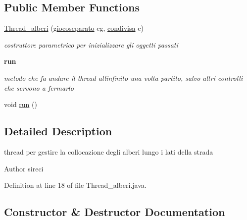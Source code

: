 \subsection*{Public Member Functions}
\begin{DoxyCompactItemize}
\item 
\hyperlink{classcargame_1_1_thread__alberi_ae91e3c161fc62007f354a164e2e090b2}{Thread\+\_\+alberi} (\hyperlink{classcargame_1_1giocoseparato}{giocoseparato} cg, \hyperlink{classcargame_1_1condivisa}{condivisa} c)
\begin{DoxyCompactList}\small\item\em costruttore parametrico per inizializzare gli oggetti passati \end{DoxyCompactList}\end{DoxyCompactItemize}
\begin{Indent}\textbf{ run}\par
{\em metodo che fa andare il thread all\textquotesingle{}infinito una volta partito, salvo altri controlli che servono a fermarlo }\begin{DoxyCompactItemize}
\item 
void \hyperlink{classcargame_1_1_thread__alberi_a13a43e6d814de94978c515cb084873b1}{run} ()
\end{DoxyCompactItemize}
\end{Indent}


\subsection{Detailed Description}
thread per gestire la collocazione degli alberi lungo i lati della strada 

\begin{DoxyAuthor}{Author}
sireci 
\end{DoxyAuthor}


Definition at line 18 of file Thread\+\_\+alberi.\+java.



\subsection{Constructor \& Destructor Documentation}
\mbox{\label{classcargame_1_1_thread__alberi_ae91e3c161fc62007f354a164e2e090b2}} 
